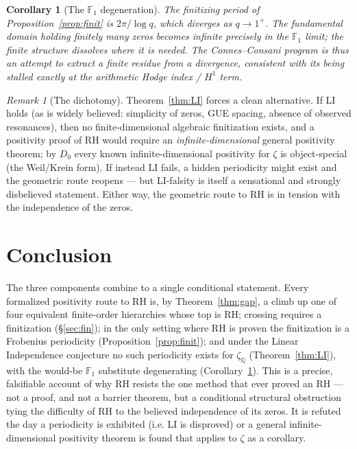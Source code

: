 \documentclass[11pt]{amsart}
\newtheorem{corollary}[theorem]{Corollary}
\theoremstyle{definition}
\theoremstyle{remark}
\newtheorem{remark}[theorem]{Remark}
\newcommand{\bbQ}{\mathbb{Q}}
\newcommand{\bbF}{\mathbb{F}}
\begin{document}
\begin{corollary}[The $\bbF_1$ degeneration]\label{cor:degen}
The finitizing period of Proposition~\ref{prop:finit} is $2\pi/\log q$, which
diverges as $q\to1^+$. The fundamental domain holding finitely many zeros
becomes infinite precisely in the $\bbF_1$ limit; the finite structure
dissolves where it is needed. The Connes--Consani program is thus an attempt to
extract a finite residue from a divergence, consistent with its being stalled
exactly at the arithmetic Hodge index / $H^1$ term.
\end{corollary}

\begin{remark}[The dichotomy]
Theorem~\ref{thm:LI} forces a clean alternative. If LI holds (as is widely
believed: simplicity of zeros, GUE spacing, absence of observed resonances),
then no finite-dimensional algebraic finitization exists, and a positivity
proof of RH would require an \emph{infinite-dimensional} general positivity
theorem; by $D_0$ every known infinite-dimensional positivity for $\zeta$ is
object-special (the Weil/Krein form). If instead LI fails, a hidden periodicity
might exist and the geometric route reopens --- but LI-falsity is itself a
sensational and strongly disbelieved statement. Either way, the geometric route
to RH is in tension with the independence of the zeros.
\end{remark}

\section{Conclusion}
The three components combine to a single conditional statement. Every
formalized positivity route to RH is, by Theorem~\ref{thm:gap}, a climb up one
of four equivalent finite-order hierarchies whose top is RH; crossing requires
a finitization (\S\ref{sec:fin}); in the only setting where RH is proven the
finitization is a Frobenius periodicity (Proposition~\ref{prop:finit}); and
under the Linear Independence conjecture no such periodicity exists for
$\zeta_{\bbQ}$ (Theorem~\ref{thm:LI}), with the would-be $\bbF_1$ substitute
degenerating (Corollary~\ref{cor:degen}). This is a precise, falsifiable
account of why RH resists the one method that ever proved an RH --- not a proof,
and not a barrier theorem, but a conditional structural obstruction tying the
difficulty of RH to the believed independence of its zeros. It is refuted the
day a periodicity is exhibited (i.e. LI is disproved) or a general
infinite-dimensional positivity theorem is found that applies to $\zeta$ as a
corollary.
\end{document}
